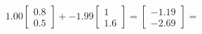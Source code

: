 \documentclass[preview]{standalone}
\begin{document}
\begin{align*}
1.00 \begin{bmatrix} 0.8 \\ 0.5 \end{bmatrix} + -1.99 \begin{bmatrix} 1 \\ 1.6 \end{bmatrix} = \begin{bmatrix} -1.19 \\ -2.69 \end{bmatrix} =
\end{align*}
\end{document}

